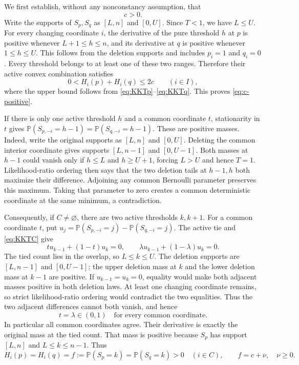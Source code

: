 \documentclass[11pt]{article}
\numberwithin{equation}{section}
\theoremstyle{remark}\newtheorem{remark}[theorem]{Remark}
\newcommand{\PP}{\mathbb P}
\begin{document}
We first establish, without any nonconstancy assumption, that
\begin{equation}\label{eq:c-positive}
 c>0.
\end{equation}
Write the supports of $S_p,S_q$ as $[L,n]$ and $[0,U]$.
Since $T<1$, we have $L\le U$. For every changing coordinate $i$,
the derivative of the pure threshold $h$ at $p$ is positive whenever
$L+1\le h\le n$, and its derivative at $q$ is positive whenever
$1\le h\le U$. This follows from the deletion supports and includes
$p_i=1$ and $q_i=0$. Every threshold belongs to at least one of these
two ranges. Therefore their active convex combination satisfies
\[
 0<H_i(p)+H_i(q)\le2c\qquad(i\in I),
\]
where the upper bound follows from
\eqref{eq:KKTp}--\eqref{eq:KKTq}. This proves \eqref{eq:c-positive}.

If there is only one active threshold $h$ and a common coordinate
$t$, stationarity in $t$ gives
$\PP(S_{p,-i}=h-1)=\PP(S_{q,-i}=h-1)$.
These are positive masses. Indeed, write the original supports as
$[L,n]$ and $[0,U]$. Deleting the common interior coordinate gives
supports $[L,n-1]$ and $[0,U-1]$. Both masses at $h-1$ could vanish
only if $h\le L$ and $h\ge U+1$, forcing $L>U$ and hence $T=1$.
Likelihood-ratio ordering then says that the two deletion tails at
$h-1,h$ both maximize their difference. Adjoining any common Bernoulli
parameter preserves this maximum. Taking that parameter to zero creates
a common deterministic coordinate at the same minimum, a contradiction.

Consequently, if $C\ne\varnothing$, there are two active thresholds
$k,k+1$. For a common coordinate $t$, put
$u_j=\PP(S_{p,-i}=j)-\PP(S_{q,-i}=j)$. The active tie and
\eqref{eq:KKTC} give
\[
 tu_{k-1}+(1-t)u_k=0,\qquad
 \lambda u_{k-1}+(1-\lambda)u_k=0.
\]
The tied count lies in the overlap, so $L\le k\le U$.
The deletion supports are $[L,n-1]$ and $[0,U-1]$; the upper deletion
mass at $k$ and the lower deletion mass at $k-1$ are positive. If
$u_{k-1}=u_k=0$, equality would make both adjacent masses positive
in both deletion laws. At least one changing coordinate remains, so
strict likelihood-ratio ordering would contradict the two equalities.
Thus the two adjacent differences cannot both vanish, and hence
\begin{equation}\label{eq:commonlambda}
 t=\lambda\in(0,1)\quad\text{for every common coordinate}.
\end{equation}
In particular all common coordinates agree. Their derivative is exactly
the original mass at the tied count. That mass is positive because
$S_p$ has support $[L,n]$ and $L\le k\le n-1$. Thus
\begin{equation}\label{eq:commonf}
 H_i(p)=H_i(q)=f:=\PP(S_p=k)=\PP(S_q=k)>0
 \quad(i\in C),\qquad f=c+\nu,\quad\nu\ge0.
\end{equation}
\end{document}
